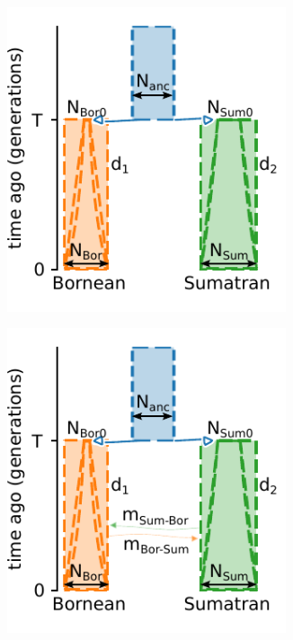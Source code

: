 \begin{figure}[ht!]
\begin{subfigure}[b]{0.3\linewidth}
        \caption{}
        \label{fig:experiments:sim_2:oran_mig}
    \end{subfigure}
    \begin{subfigure}[b]{0.33\linewidth}
        \centering
        \includegraphics[width=0.9\textwidth]{images_experiments/suimulation_2_stdpopsim/picture_ORAN_STRUCT_NOMIG.pdf}
        \caption{}
        \label{fig:experiments:sim_2:oran_struct_nomig}
    \end{subfigure}%
    \begin{subfigure}[b]{0.33\linewidth}
        \centering
        \includegraphics[width=0.9\textwidth]{images_experiments/suimulation_2_stdpopsim/picture_ORAN_STRUCT_MIG.pdf}

\end{subfigure}
\end{figure}
